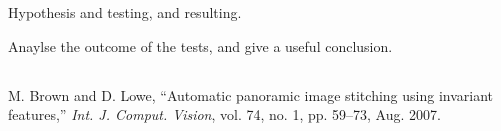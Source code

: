 \documentclass[10pt,twocolumn,letterpaper]{article}
\begin{document}
Hypothesis and testing, and resulting.

Anaylse the outcome of the tests, and give a useful conclusion.

\subsection{}


\begin{thebibliography}{9}
M. Brown and D. Lowe, ``Automatic panoramic image stitching using invariant features,''
\textit{Int. J. Comput. Vision}, vol. 74, no. 1, pp. 59–73, Aug. 2007.

\end{thebibliography}
\end{document}

